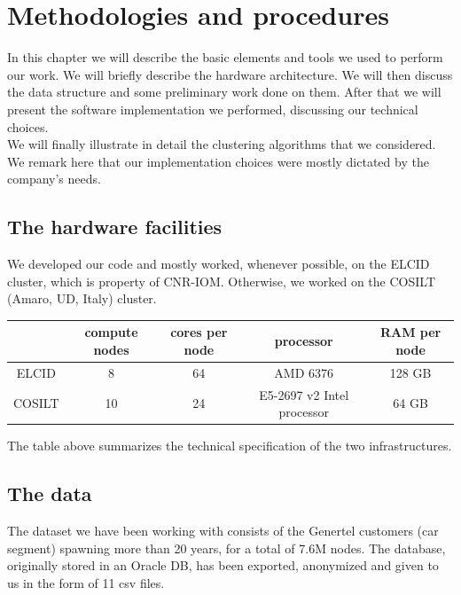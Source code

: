 \documentclass[a4paper,11pt]{book}
\begin{document}
\chapter{Methodologies and procedures}
In this chapter we will describe the basic elements and tools we used to perform our work. We will briefly describe the hardware architecture. We will then discuss the data structure and some preliminary work done on them. After that we will present the software implementation we performed, discussing our technical choices.\\
We will finally illustrate in detail the clustering algorithms that we considered. We remark here that our implementation choices were mostly dictated by the company's needs.
\section{The hardware facilities}
We developed our code and mostly worked, whenever possible, on the ELCID cluster, which is property of CNR-IOM. Otherwise, we worked on the COSILT (Amaro, UD, Italy) cluster.
\begin{center}
\begin{tabular}{||c|c|c|c|c||}
\hline
 \phantom{0} & compute nodes & cores per node & processor & RAM per node\\ 
\hline
ELCID & 8 & 64 & AMD 6376 & 128 GB \\
\hline
COSILT & 10 & 24 & E5-2697 v2 Intel processor & 64 GB \\
\hline
\end{tabular}
\end{center}
The table above summarizes the technical specification of the two infrastructures.
\section{The data}
The dataset we have been working with consists of the Genertel customers (car segment) spawning more than 20 years, for a total of 7.6M nodes. The database, originally stored in an Oracle DB, has been exported, anonymized and given to us in the form of 11 csv files.\\
\end{document}
